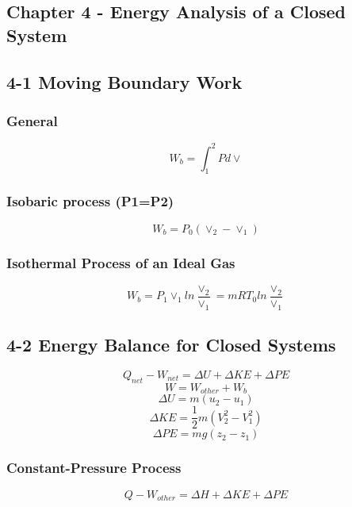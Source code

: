 \documentclass[10pt,landscape]{article}
\begin{document}
\begin{multicols}{3}
\section{Chapter 4 - Energy Analysis of a Closed System}
\subsection{4-1 Moving Boundary Work}
\subsubsection{General}
\begin{equation}
    W_b=\int^2_1Pd\vee
\end{equation}
\subsubsection{Isobaric process (P1=P2)}
\begin{equation}
    W_b=P_0(\vee_2-\vee_1)
\end{equation}
\subsubsection{Isothermal Process of an Ideal Gas}
\begin{equation}
    W_b=P_1\vee_1ln\frac{\vee_2}{\vee_1}=mRT_0ln\frac{\vee_2}{\vee_1}
\end{equation}
\subsection{4-2 Energy Balance for Closed Systems}
\begin{equation}
    Q_{net}-W_{net}=\Delta U + \Delta KE + \Delta PE
\end{equation}
\begin{equation}
    W=W_{other}+W_b
\end{equation}
\begin{equation}
    \Delta U = m(u_2-u_1)
\end{equation}
\begin{equation}
    \Delta KE = \frac{1}{2}m(V^2_2-V_1^2)
\end{equation}
\begin{equation}
    \Delta PE = mg(z_2-z_1)
\end{equation}
\subsubsection{Constant-Pressure Process}
\begin{equation}
    Q-W_{other}=\Delta H+\Delta KE + \Delta PE
\end{equation}

\end{multicols}
\end{document}
